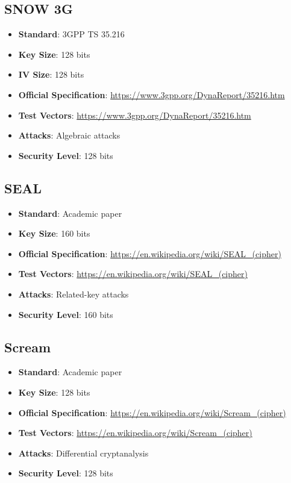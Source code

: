 \documentclass[11pt,a4paper]{article}
\begin{document}
\subsection{SNOW 3G}
\begin{itemize}
    \item \textbf{Standard}: 3GPP TS 35.216
    \item \textbf{Key Size}: 128 bits
    \item \textbf{IV Size}: 128 bits
    \item \textbf{Official Specification}: \url{https://www.3gpp.org/DynaReport/35216.htm}
    \item \textbf{Test Vectors}: \url{https://www.3gpp.org/DynaReport/35216.htm}
    \item \textbf{Attacks}: Algebraic attacks
    \item \textbf{Security Level}: 128 bits
\end{itemize}

\subsection{SEAL}
\begin{itemize}
    \item \textbf{Standard}: Academic paper
    \item \textbf{Key Size}: 160 bits
    \item \textbf{Official Specification}: \url{https://en.wikipedia.org/wiki/SEAL_(cipher)}
    \item \textbf{Test Vectors}: \url{https://en.wikipedia.org/wiki/SEAL_(cipher)}
    \item \textbf{Attacks}: Related-key attacks
    \item \textbf{Security Level}: 160 bits
\end{itemize}

\subsection{Scream}
\begin{itemize}
    \item \textbf{Standard}: Academic paper
    \item \textbf{Key Size}: 128 bits
    \item \textbf{Official Specification}: \url{https://en.wikipedia.org/wiki/Scream_(cipher)}
    \item \textbf{Test Vectors}: \url{https://en.wikipedia.org/wiki/Scream_(cipher)}
    \item \textbf{Attacks}: Differential cryptanalysis
    \item \textbf{Security Level}: 128 bits
\end{itemize}
\end{document}

